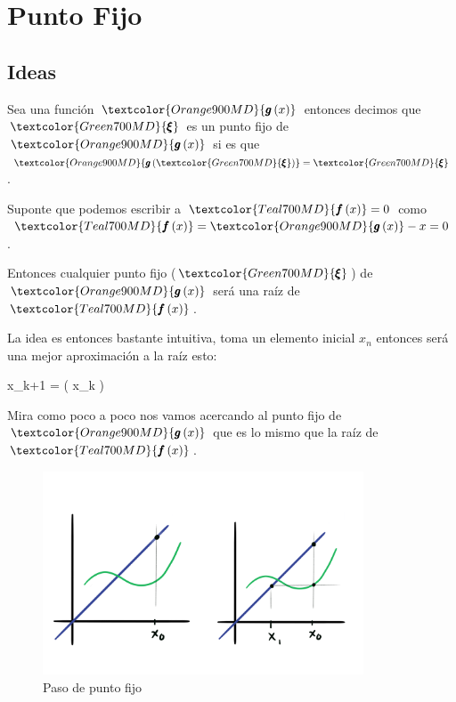 \documentclass[12pt, fleqn]{report}                             %
\def \Eq {equation}                                             %
\newenvironment{MultiLineEquation*}[1]                          %
        {\begin{\Eq*}\begin{alignedat}{#1}}                         %
        {\end{alignedat}\end{\Eq*}}                                 %
\newenvironment{LargeEq} {\begingroup \Large}{\endgroup}        %
\theoremstyle{break}                                            %
\newcommand{\Wrap}[1]           {\left( #1 \right)}             %
\newcommand{\Color}[2]{\textcolor{#1}{#2}}                      %
\newcommand \ColorFun          {Teal700MD}                      %
\newcommand \ColorFunG         {Orange900MD}                    %
\newcommand \ColorRoot         {Green700MD}                     %
\newcommand \ColorVarX         {Purple300MD}                    %
\newcommand \ColorVarXpu       {Purple700MD}                    %
\newcommand \Fun[1]      {\Color{\ColorFun}{\pmb{f}\Wrap{#1}}}          %
\newcommand \FunG[1]     {\Color{\ColorFunG}{\pmb{g}\Wrap{#1}}}         %
\newcommand \Root        {\Color{\ColorRoot}{\pmb{\xi} }}               %
\newcommand \VarX        {\Color{\ColorVarX}{x_k }}                     %
\newcommand \VarXpu      {\Color{\ColorVarXpu}{x_{k+1}  }}              %
\begin{document}
    \chapter{Punto Fijo}

        \clearpage
        \section{Ideas}

            Sea una función $\FunG{x}$ entonces decimos que $\Root$ es un punto fijo de $\FunG{x}$ si 
            es que $\FunG{\Root} = \Root$.

            Suponte que podemos escribir a $\Fun{x} = 0$ como 
            $\Fun{x} = \FunG{x} - x = 0$.

            Entonces cualquier punto fijo ($\Root$) de $\FunG{x}$ será una raíz de $\Fun{x}$.

            La idea es entonces bastante intuitiva, toma un elemento inicial $x_n$ entonces
            será una mejor aproximación a la raíz esto:
            \begin{LargeEq}
                \begin{MultiLineEquation*}{3}
                    \VarXpu = \FunG{\VarX}
                \end{MultiLineEquation*}
            \end{LargeEq}

            Mira como poco a poco nos vamos acercando al punto fijo de $\FunG{x}$ que es lo
            mismo que la raíz de $\Fun{x}$.
            \begin{figure}[h]
                \centering
                \includegraphics[width=0.85\textwidth]{FixedPoint}
                \caption{Paso de punto fijo}
            \end{figure}
\end{document}
